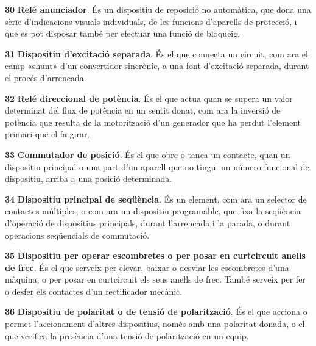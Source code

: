 \begin{multicols}{2}
\begin{list}{}
\item[\textbf{30}]  
 \textbf{Relé anunciador}. És un dispositiu de
reposició no automàtica, que dona una sèrie d'indicacions visuals
individuals, de les funcions d'aparells de protecció, i que es pot
disposar també per efectuar una funció de bloqueig.

\item[\textbf{31}]  
\textbf{Dispositiu d'excitació
separada}. És el que connecta un circuit, com ara el camp «shunt»
d'un convertidor sincrònic, a una font d'excitació separada, durant el procés
d'arrencada.

\item[\textbf{32}]  
\textbf{Relé direccional de potència}. És el que actua quan se supera un valor determinat del
flux de potència en un sentit donat, com ara la inversió de potència que resulta de la motorització d'un generador que ha perdut l'element primari que el fa girar.

\item[\textbf{33}]  
\textbf{Commutador de posició}. És el que
obre o tanca un contacte, quan un dispositiu principal o una part d'un aparell que no tingui un número funcional de dispositiu, arriba a una posició determinada.

\item[\textbf{34}]  
\textbf{Dispositiu principal de
 seqüència}. És un element, com ara un selector de contactes múltiples, o com ara un
 dispositiu programable,
 que fixa la seqüència d'operació
de dispositius principals, durant l'arrencada i la parada, o durant  operacions seqüencials de commutació.


\item[\textbf{35}]   
\textbf{Dispositiu per operar escombretes o per posar en curtcircuit anells de frec}. És el que serveix per elevar, baixar o
desviar les escombretes d'una màquina, o per posar en curtcircuit
els seus anells de frec. També serveix per fer o desfer els
contactes d'un rectificador mecànic.

\item[\textbf{36}] 
 
\textbf{Dispositiu de
polaritat o de tensió de polarització}. És el que acciona o permet
l'accionament d'altres dispositius, només amb una polaritat
donada, o el que verifica la presència d'una tensió de polarització
en un equip.


\end{list}
\end{multicols}
